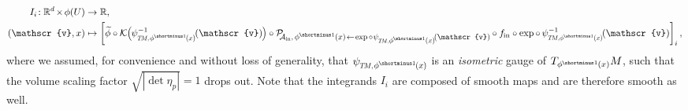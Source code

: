\begin{align}\label{eq:integrand_smoothness_full}
    I_i\!: \R^d \mkern-2mu\times\mkern-2mu \phi(U) &\to \R, \\
    (\mathscr{v},x) &\mapsto
    \bigg[ \widetilde{\phi} \circ
    \K\pig(\mkern-1mu \psi_{\protect\scalebox{.65}{$T\!M\mkern-1mu,\mkern2mu$}\protect\scalebox{.75}{$\phi^{\mkern-1mu\shortminus1}\mkern-1mu(x)$}}^{-1} \mkern-2mu(\mathscr{v}) \mkern-1mu\pig) \circ
    \mathcal{P}_{\mkern-4mu\protect\scalebox{.8}{$\!\Ain$},\protect\scalebox{.83}{$\,\phi^{\mkern-1mu\shortminus1}(x)\!\leftarrow\!\exp \circ\mkern1mu \psi_{\protect\scalebox{.7}{$T\!M\mkern-1mu,\mkern1mu$}\protect\scalebox{.9}{$\phi^{\mkern-1mu\shortminus1}(x)$}}\!(\mathscr{v}) $}} \mkern-1mu\circ
    \fin \circ \exp \circ \,
    \psi_{\protect\scalebox{.65}{$T\!M\mkern-1mu,$}\protect\scalebox{.7}{$\phi^{\mkern-1mu\shortminus1}(x)$}}^{-1} \mkern-2mu(\mathscr{v})
    \bigg]_i
    \nonumber \,,
\end{align}
where we assumed, for convenience and without loss of generality, that
$\psi_{\protect\scalebox{.65}{$T\!M\mkern-1mu,\mkern2mu$}\protect\scalebox{.75}{$\phi^{\mkern-1mu\shortminus1}\mkern-1mu(x)$}}$
is an \emph{isometric} gauge of $T_{\phi^{\mkern-1mu\shortminus1}\mkern-1mu(x)}M$, such that the volume scaling factor $\sqrt{|\! \det\eta_p|} = 1$ drops out.
Note that the integrands $I_i$ are composed of smooth maps and are therefore smooth as well.



